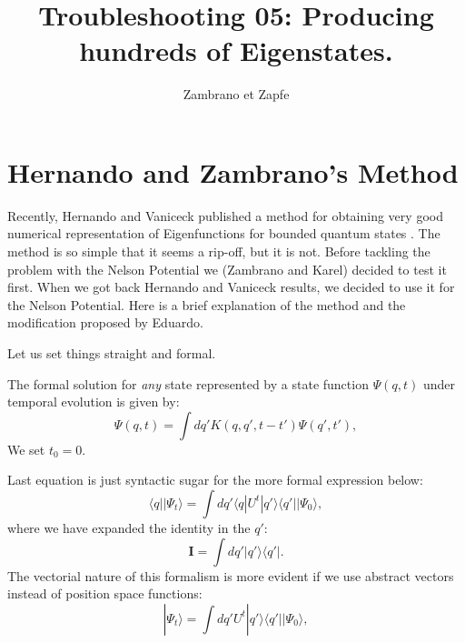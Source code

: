 \documentclass[a4paper,12pt]{article}
\newcommand{\Ifase}{\mathbf{I}}
\newcommand{\bra}[1]{\langle #1|}
\newcommand{\ket}[1]{|#1\rangle}
\begin{document}
\title{Troubleshooting 05: Producing hundreds of Eigenstates. }
\author{Zambrano et Zapfe}


\maketitle

\section{Hernando and Zambrano's Method}

Recently, Hernando and Vaniceck published a method for obtaining
very good numerical representation of Eigenfunctions for bounded
quantum states \cite{Hernando}. The method is so simple
that it seems a rip-off, but it is not. 
Before tackling the problem with the Nelson Potential we (Zambrano and Karel)
decided to test it first. When we got back Hernando and Vaniceck 
results, we decided to use it for the Nelson Potential.
Here is a brief explanation of the method and the
modification proposed by Eduardo.

Let us set things straight and formal.

The formal solution for \emph{any} state represented by a state
function $\Psi(q,t)$ under temporal evolution is given by:
\begin{equation}
\Psi(q,t)=\int dq' K(q,q', t-t') \Psi(q',t'),
\end{equation}
We set  $t_0=0$.

Last equation is just syntactic sugar for the more formal expression below:
\begin{equation}\label{evolbien}
\bra{q}\ket{\Psi_t}=\int dq' \bra{q}U^t\ket{q'}\bra{q'}\ket{\Psi_0},
\end{equation}
where we have expanded the identity in the  $q'$: 
\begin{equation}
\Ifase=\int dq' \ket{q'}\bra{q'}.
\end{equation}
The vectorial nature of this formalism is more evident
if we use abstract vectors instead of position space functions:
\begin{equation}
\ket{\Psi_t}=\int dq' U^t\ket{q'}\bra{q'}\ket{\Psi_0},
\end{equation}
\end{document}

